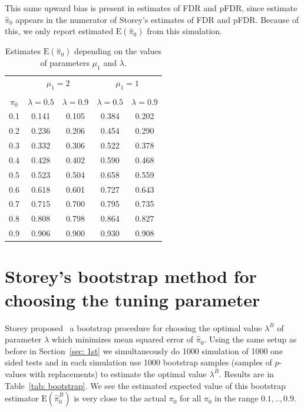 \documentclass[10pt]{article}
\begin{document}
This same upward bias is present in estimates of FDR and pFDR, since estimate $\widehat{\pi}_{0}$ appears in the numerator of Storey's estimates of FDR and pFDR. Because of this, we only report estimated $\text{E}(\widehat{\pi}_{0})$ from this simulation.

\begin{table}[H]
	\centering	
	\begin{tabular}{ccccc}
		& \multicolumn{2}{c}{$\mu_{1} = 2$} & \multicolumn{2}{c}{$\mu_{1} = 1$} \\
		\cmidrule(lr){2-3} \cmidrule(lr){4-5}\\
		$\pi_{0}$ & $\lambda = 0.5$ & $\lambda = 0.9$ & $\lambda = 0.5$ & $\lambda = 0.9$  \\ 
		\hline
			0.1 & 0.141 & 0.105 & 0.384 & 0.202 \\ 
			0.2 & 0.236 & 0.206 & 0.454 & 0.290 \\ 
			0.3 & 0.332 & 0.306 & 0.522 & 0.378 \\ 
			0.4 & 0.428 & 0.402 & 0.590 & 0.468 \\ 
			0.5 & 0.523 & 0.504 & 0.658 & 0.559 \\ 
			0.6 & 0.618 & 0.601 & 0.727 & 0.643 \\ 
			0.7 & 0.715 & 0.700 & 0.795 & 0.735 \\ 
			0.8 & 0.808 & 0.798 & 0.864 & 0.827 \\ 
			0.9 & 0.906 & 0.900 & 0.930 & 0.908 \\ 
		\hline
	\end{tabular}
	\caption{Estimates $\text{E}(\widehat{\pi}_{0})$ depending on the values of parameters $\mu_{1}$ and $\lambda$.}
	\label{tab: bias}	
\end{table}

\section{Storey's bootstrap method for choosing the tuning parameter}
Storey proposed~\cite{Storey} a bootstrap procedure for choosing the optimal value $\lambda^{B}$ of parameter $\lambda$ which minimizes mean squared error of $\widehat{\pi}_{0}$. Using the same setup as before in Section~\ref{sec: 1st} we simultaneously do 1000 simulation of 1000 one sided tests and in each simulation use 1000 bootstrap samples (samples of $p$-values with replacements) to estimate the optimal value $\lambda^{B}$. Results are in Table~\ref{tab: bootstrap}. We see the estimated expected value of this bootstrap estimator $\text{E}(\widehat{\pi}^{B}_{0})$ is very close to the actual $\pi_{0}$ for all $\pi_{0}$ in the range $0.1, .., 0.9$. 
\end{document}
